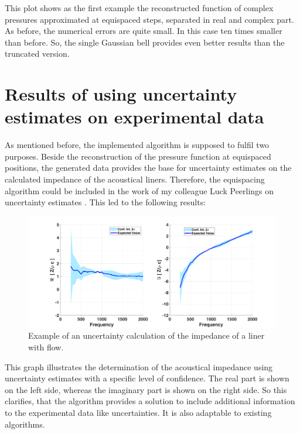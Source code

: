\documentclass[11pt]{report} %
\begin{document}
This plot shows as the first example the reconstructed function of complex pressures approximated at equispaced steps, separated in real and complex part.
As before, the numerical errors are quite small.
In this case ten times smaller than before. 
So, the single Gaussian bell provides even better results than the truncated version. 


\section{Results of using uncertainty estimates on experimental data}
As mentioned before, the implemented algorithm is supposed to fulfil two purposes. 
Beside the reconstruction of the pressure function at equispaced positions, the generated data provides the base for uncertainty estimates on the calculated impedance of the acoustical liners. 
Therefore, the equispacing algorithm could be included in the work of my colleague Luck Peerlings on uncertainty estimates \cite{Luck}. 
This led to the following results: 

\begin{figure}[H]
\centering
\includegraphics[width=1\textwidth]{./Figures/UncertaintyFigure}
\caption{Example of an uncertainty calculation of the impedance of a liner with flow.}
\end{figure}

This graph illustrates the determination of the acoustical impedance using uncertainty estimates with a specific level of confidence.
The real part is shown on the left side, whereas the imaginary part is shown on the right side. 
So this clarifies, that the algorithm provides a solution to include additional information to the experimental data like uncertainties.
It is also adaptable to existing algorithms. 

\newpage
\end{document}
